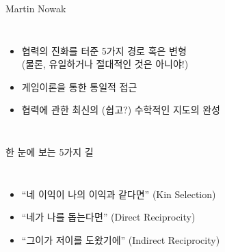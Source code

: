 \documentclass[final]{beamer}
\begin{document}
\begin{frame}[t]{Martin Nowak}
	\begin{columns}[c]
	\column{20em}
	\begin{itemize}
	\item 협력의 진화를 터준 5가지 경로 혹은 변형\\(물론, 유일하거나 절대적인 것은 아니야!)
	\item 게임이론을 통한 통일적 접근 
	\item 협력에 관한 최신의 (쉽고?) 수학적인 지도의 완성
	\end{itemize}
	\column{12em}
	\end{columns}
\end{frame}

\begin{frame}[t]{한 눈에 보는 5가지 길}
	\begin{columns}[c]
	\column{10em}
	\column{20em}
	\vspace{-1em}
	\begin{itemize}
	\item ``네 이익이 나의 이익과 같다면'' (Kin Selection)\\[4em]
	\item ``네가 나를 돕는다면'' (Direct Reciprocity)\\[5em]
	\item ``그이가 저이를 도왔기에'' (Indirect Reciprocity) 
	\end{itemize}
	\end{columns}
\end{frame}
\end{document}
